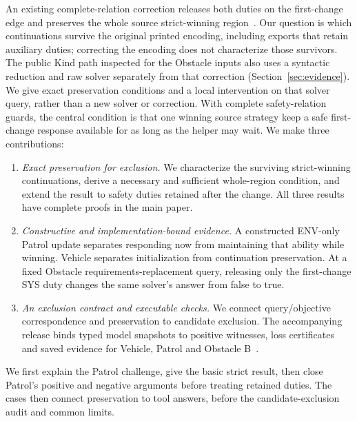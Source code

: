 An existing complete-relation correction releases both duties on the
first-change edge and preserves the whole source strict-winning
region~\cite{spectrarelease2024}. Our question is which continuations survive
the original printed encoding, including exports that retain auxiliary
duties; correcting the encoding does not characterize those survivors.
The public Kind path inspected for the Obstacle inputs also uses a syntactic
reduction and raw solver separately from that correction
(Section~\ref{sec:evidence}). We give exact preservation conditions and a
local intervention on that solver query, rather than a new solver or
correction. With complete safety-relation guards, the central condition is that one winning source strategy keep
a safe first-change response available for as long as the helper may wait.
We make three contributions:
\begin{enumerate}
\item \emph{Exact preservation for exclusion.} We characterize the surviving strict-winning
continuations, derive a necessary and sufficient whole-region condition,
and extend the result to safety duties retained after the change. All three
results have complete proofs in the main paper.
\item \emph{Constructive and implementation-bound evidence.} A constructed
ENV-only Patrol update separates responding now from maintaining that ability
while winning. Vehicle separates initialization from continuation preservation.
At a fixed Obstacle requirements-replacement query, releasing only the
first-change SYS duty changes the same solver's
answer from false to true.
\item \emph{An exclusion contract and executable checks.} We connect
query/objective correspondence and preservation to candidate exclusion.
The accompanying release binds typed model snapshots to positive
witnesses, loss certificates and saved evidence for Vehicle, Patrol and
Obstacle B~\cite{artifactrepository}.
\end{enumerate}
We first explain the Patrol challenge, give the basic strict result, then
close Patrol's positive and negative arguments before treating retained duties.
The cases then connect preservation to tool answers, before the
candidate-exclusion audit and common limits.
